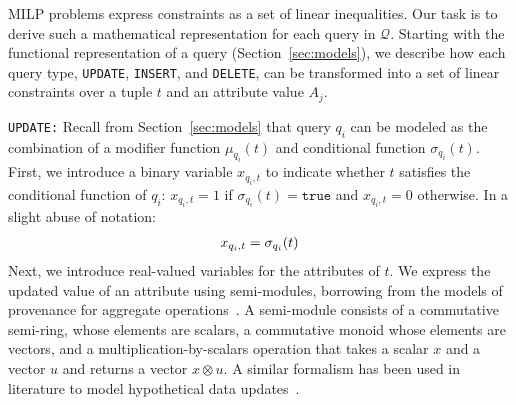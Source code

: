 MILP problems express constraints as a set of linear inequalities. Our
task is to derive such a mathematical representation for each query in
$\mathcal{Q}$. Starting with the functional representation of a
query (Section~\ref{sec:models}), we describe how each query type,
\texttt{UPDATE}, \texttt{INSERT}, and \texttt{DELETE}, can be
transformed into a set of linear constraints over a tuple $t$ and an
attribute value $A_j$.



\smallskip
\noindent
\texttt{UPDATE:}
Recall from Section~\ref{sec:models} that query $q_i$ can be modeled
as the combination of a modifier function $\mu_{q_i}(t)$ and
conditional function $\sigma_{q_i}(t)$. First, we introduce a binary
variable $x_{q_i, t}$ to indicate whether $t$ satisfies the
conditional function of $q_i$: $x_{q_i, t}=1$ if
$\sigma_{q_i}(t)=\texttt{true}$ and $x_{q_i, t}=0$ otherwise. In a
slight abuse of notation:
{\scriptsize
\begin{align}
\label{eq:x}
x_{q_i, t} = \sigma_{q_i}(t)
\vspace*{-0.1in}
\end{align}
}
Next, we introduce real-valued variables for the attributes of $t$.
We express the updated value
of an attribute using semi-modules, borrowing from the models of
provenance for aggregate operations~\cite{Amsterdamer2011}. A
semi-module consists of a commutative semi-ring, whose elements are
scalars, a commutative monoid whose elements are vectors, and a
multiplication-by-scalars operation that takes a scalar $x$ and a
vector $u$ and returns a vector $x \otimes u$. A similar formalism has
been used in literature to model hypothetical data
updates~\cite{tiresias}.

